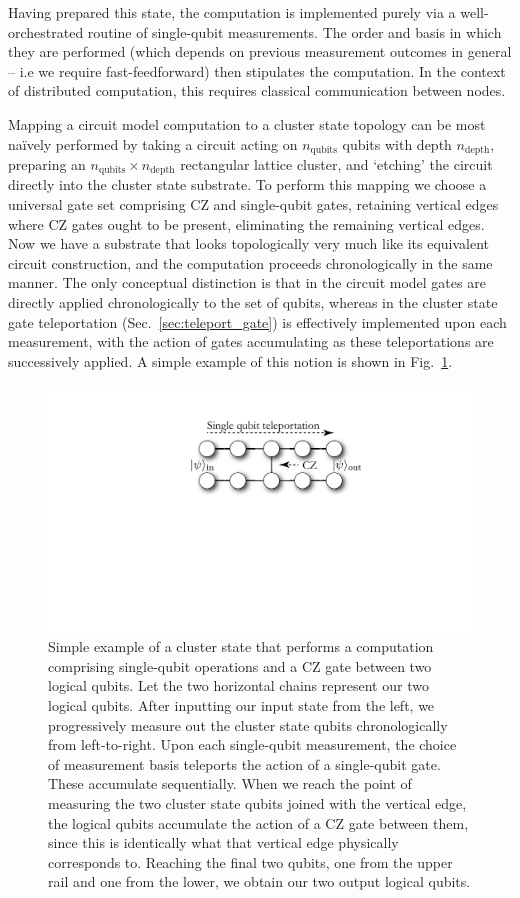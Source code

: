 \documentclass[aps,rmp,twocolumn,amsmath,amssymb,nofootinbib,superscriptaddress,longbibliography,floatfix,table-of-contents,eqsecnum]{revtex4-1}
\begin{document}
Having prepared this state, the computation is implemented purely via a well-orchestrated routine of single-qubit measurements. The order and basis in which they are performed (which depends on previous measurement outcomes in general -- i.e we require fast-feedforward) then stipulates the computation. In the context of distributed computation, this requires classical communication between nodes.

Mapping a circuit model computation to a cluster state topology can be most na{\" i}vely performed by taking a circuit acting on $n_\text{qubits}$ qubits with depth $n_\text{depth}$, preparing an \mbox{$n_\text{qubits}\times n_\text{depth}$} rectangular lattice cluster, and `etching' the circuit directly into the cluster state substrate. To perform this mapping we choose a universal gate set comprising CZ and single-qubit gates, retaining vertical edges where CZ gates ought to be present, eliminating the remaining vertical edges. Now we have a substrate that looks topologically very much like its equivalent circuit construction, and the computation proceeds chronologically in the same manner. The only conceptual distinction is that in the circuit model gates are directly applied chronologically to the set of qubits, whereas in the cluster state gate teleportation (Sec.~\ref{sec:teleport_gate}) is effectively implemented upon each measurement, with the action of gates accumulating as these teleportations are successively applied. A simple example of this notion is shown in Fig.~\ref{fig:cluster_state_circuit}.

\begin{figure}[!htb]
	\includegraphics[width=0.9\columnwidth]{cluster_state_circuit}
	\caption{Simple example of a cluster state that performs a computation comprising single-qubit operations and a CZ gate between two logical qubits. Let the two horizontal chains represent our two logical qubits. After inputting our input state from the left, we progressively measure out the cluster state qubits chronologically from left-to-right. Upon each single-qubit measurement, the choice of measurement basis teleports the action of a single-qubit gate. These accumulate sequentially. When we reach the point of measuring the two cluster state qubits joined with the vertical edge, the logical qubits accumulate the action of a CZ gate between them, since this is identically what that vertical edge physically corresponds to. Reaching the final two qubits, one from the upper rail and one from the lower, we obtain our two output logical qubits.} \label{fig:cluster_state_circuit}
\end{figure}
\end{document}
